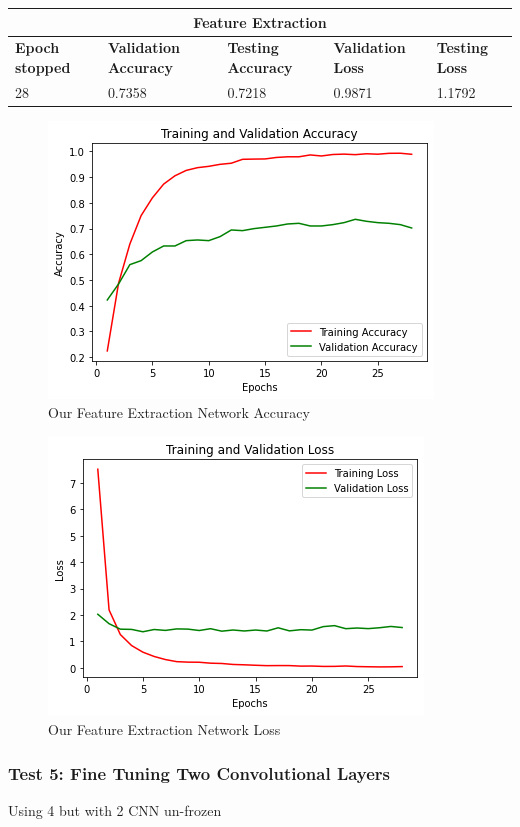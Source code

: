  
 \medskip

\begin{tabular}{ |p{2cm}|p{2cm}|p{2cm}|p{2cm}|p{2cm}|  }
\hline
\multicolumn{5}{|c|}{Feature Extraction} \\
\hline
\textbf{Epoch stopped} & \textbf{Validation Accuracy} & \textbf{Testing Accuracy} & \textbf{Validation Loss} & \textbf{Testing Loss} \\
\hline
28 & 0.7358 & 0.7218 & 0.9871 & 1.1792\\
\hline
\end{tabular}

\medskip

\begin{figure}[H]
	\centering
	\includegraphics[height=0.45\textwidth]{img/vgg16/vgg16ft1dropacc.png}
	\caption{Our Feature Extraction Network Accuracy}
	\label{fig:vgg16ft1dropacc}
\end{figure}

\begin{figure}[H]
	\centering
	\includegraphics[height=0.45\textwidth]{img/vgg16/vgg16ft1droploss.png}
	\caption{Our Feature Extraction Network Loss}
	\label{fig:vgg16ft1droploss}
\end{figure}





\subsubsection{Test 5: Fine Tuning Two Convolutional Layers}
Using 4 but with 2 CNN un-frozen

